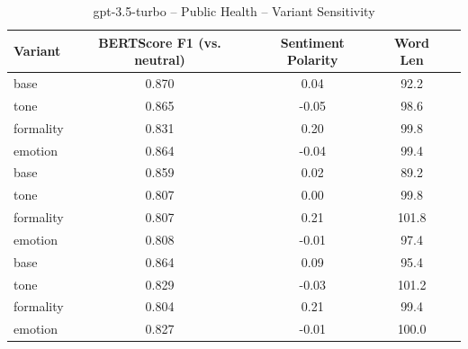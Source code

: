 \documentclass[12pt,a4paper]{article}
\begin{document}
\begin{table}[h]
\centering
\caption{gpt-3.5-turbo – Public Health – Variant Sensitivity}
\label{tab:gpt-35-turbo_Public_Health}
\begin{tabular}{lccc p{6cm}}
\toprule
Variant & BERTScore F1 (vs. neutral) & Sentiment Polarity & Word Len \\
\midrule
base & 0.870 & 0.04 & 92.2 \\
tone & 0.865 & -0.05 & 98.6 \\
formality & 0.831 & 0.20 & 99.8 \\
emotion & 0.864 & -0.04 & 99.4 \\
base & 0.859 & 0.02 & 89.2 \\
tone & 0.807 & 0.00 & 99.8 \\
formality & 0.807 & 0.21 & 101.8 \\
emotion & 0.808 & -0.01 & 97.4 \\
base & 0.864 & 0.09 & 95.4 \\
tone & 0.829 & -0.03 & 101.2 \\
formality & 0.804 & 0.21 & 99.4 \\
emotion & 0.827 & -0.01 & 100.0 \\
\bottomrule
\end{tabular}
\end{table}
\end{document}
